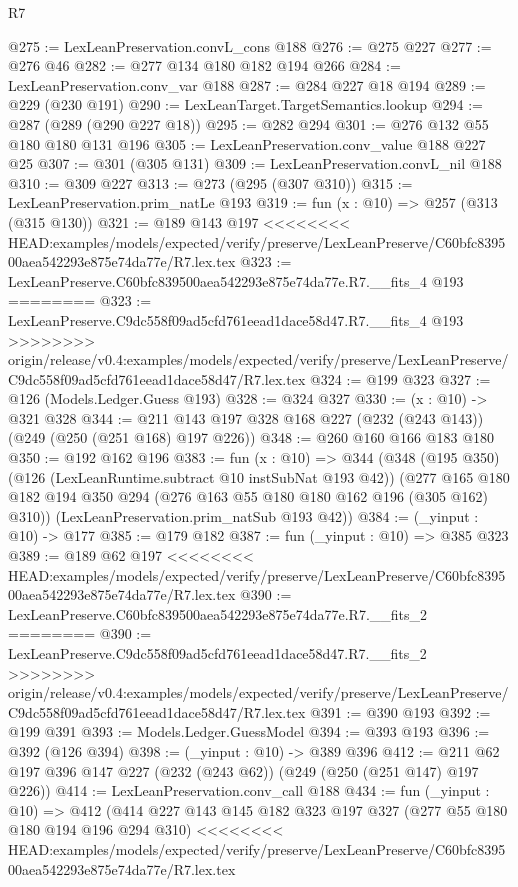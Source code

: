\begin{lexlean}{R7}
\begin{coremodule}
{{{{{{{{{{{{{@275 := LexLeanPreservation.convL_cons @188
@276 := @275 @227
@277 := @276 @46
@282 := @277 @134 @180 @182 @194 @266
@284 := LexLeanPreservation.conv_var @188
@287 := @284 @227 @18 @194
@289 := @229 (@230 @191)
@290 := LexLeanTarget.TargetSemantics.lookup
@294 := @287 (@289 (@290 @227 @18))
@295 := @282 @294
@301 := @276 @132 @55 @180 @180 @131 @196
@305 := LexLeanPreservation.conv_value @188 @227 @25
@307 := @301 (@305 @131)
@309 := LexLeanPreservation.convL_nil @188
@310 := @309 @227
@313 := @273 (@295 (@307 @310))
@315 := LexLeanPreservation.prim_natLe @193
@319 := fun (x : @10) => @257 (@313 (@315 @130))
@321 := @189 @143 @197
<<<<<<<< HEAD:examples/models/expected/verify/preserve/LexLeanPreserve/C60bfc839500aea542293e875e74da77e/R7.lex.tex
@323 := LexLeanPreserve.C60bfc839500aea542293e875e74da77e.R7.__fits_4 @193
========
@323 := LexLeanPreserve.C9dc558f09ad5cfd761eead1dace58d47.R7.__fits_4 @193
>>>>>>>> origin/release/v0.4:examples/models/expected/verify/preserve/LexLeanPreserve/C9dc558f09ad5cfd761eead1dace58d47/R7.lex.tex
@324 := @199 @323
@327 := @126 (Models.Ledger.Guess @193)
@328 := @324 @327
@330 := (x : @10) -> @321 @328
@344 := @211 @143 @197 @328 @168 @227 (@232 (@243 @143)) (@249 (@250 (@251 @168) @197 @226))
@348 := @260 @160 @166 @183 @180
@350 := @192 @162 @196
@383 := fun (x : @10) =>
  @344
    (@348
      (@195 @350)
      (@126 (LexLeanRuntime.subtract @10 instSubNat @193 @42))
      (@277 @165 @180 @182 @194 @350 @294 (@276 @163 @55 @180 @180 @162 @196 (@305 @162) @310))
      (LexLeanPreservation.prim_natSub @193 @42))
@384 := (_yinput : @10) -> @177
@385 := @179 @182
@387 := fun (_yinput : @10) => @385 @323
@389 := @189 @62 @197
<<<<<<<< HEAD:examples/models/expected/verify/preserve/LexLeanPreserve/C60bfc839500aea542293e875e74da77e/R7.lex.tex
@390 := LexLeanPreserve.C60bfc839500aea542293e875e74da77e.R7.__fits_2
========
@390 := LexLeanPreserve.C9dc558f09ad5cfd761eead1dace58d47.R7.__fits_2
>>>>>>>> origin/release/v0.4:examples/models/expected/verify/preserve/LexLeanPreserve/C9dc558f09ad5cfd761eead1dace58d47/R7.lex.tex
@391 := @390 @193
@392 := @199 @391
@393 := Models.Ledger.GuessModel
@394 := @393 @193
@396 := @392 (@126 @394)
@398 := (_yinput : @10) -> @389 @396
@412 := @211 @62 @197 @396 @147 @227 (@232 (@243 @62)) (@249 (@250 (@251 @147) @197 @226))
@414 := LexLeanPreservation.conv_call @188
@434 := fun (_yinput : @10) =>
  @412
    (@414
      @227
      @143
      @145
      @182
      @323
      @197
      @327
      (@277 @55 @180 @180 @194 @196 @294 @310)
<<<<<<<< HEAD:examples/models/expected/verify/preserve/LexLeanPreserve/C60bfc839500aea542293e875e74da77e/R7.lex.tex
}}}}}}}}}}}}}
\end{coremodule}
\end{lexlean}
